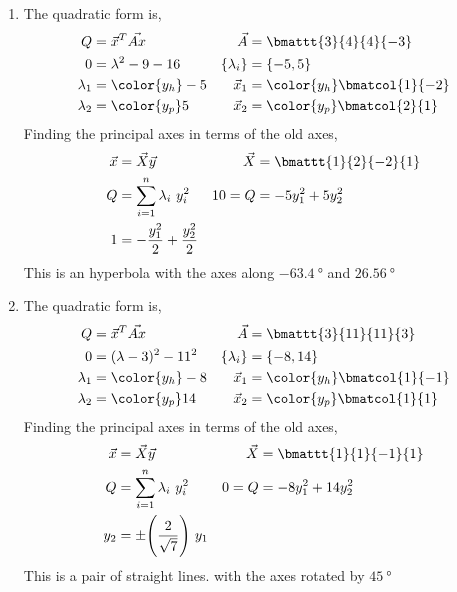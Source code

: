 \begin{enumerate}
    \item The quadratic form is,
          \begin{align}
              Q             & = \vec{x}^T \vec{Ax}          &
              \vec{A}       & = \bmattt{3}{4}{4}{-3}          \\
              0             & = \lambda^2 - 9 - 16          &
              \{\lambda_i\} & = \{-5, 5\}                     \\
              \lambda_1     & = \color{y_h} -5              &
              \vec{x}_1     & = \color{y_h} \bmatcol{1}{-2}   \\
              \lambda_2     & = \color{y_p} 5               &
              \vec{x}_2     & = \color{y_p} \bmatcol{2}{1}
          \end{align}
          Finding the principal axes in terms of the old axes,
          \begin{align}
              \vec{x} & = \vec{X}\vec{y}                     &
              \vec{X} & = \bmattt{1}{2}{-2}{1}                 \\
              Q       & = \sum_{i=1}^{n}\lambda_i\ y_i^2     &
              10 = Q  & = -5y_1^2 + 5y_2^2                     \\
              1       & = -\frac{y_1^2}{2} + \frac{y_2^2}{2}
          \end{align}
          This is an hyperbola with the axes along $ \SI{-63.4}{\degree} $ and
          $ \SI{26.56}{\degree} $

    \item The quadratic form is,
          \begin{align}
              Q             & = \vec{x}^T \vec{Ax}          &
              \vec{A}       & = \bmattt{3}{11}{11}{3}         \\
              0             & = (\lambda - 3)^2 - 11^2      &
              \{\lambda_i\} & = \{-8, 14\}                    \\
              \lambda_1     & = \color{y_h} -8              &
              \vec{x}_1     & = \color{y_h} \bmatcol{1}{-1}   \\
              \lambda_2     & = \color{y_p} 14              &
              \vec{x}_2     & = \color{y_p} \bmatcol{1}{1}
          \end{align}
          Finding the principal axes in terms of the old axes,
          \begin{align}
              \vec{x} & = \vec{X}\vec{y}                          &
              \vec{X} & = \bmattt{1}{1}{-1}{1}                      \\
              Q       & = \sum_{i=1}^{n}\lambda_i\ y_i^2          &
              0 = Q   & = -8y_1^2 + 14y_2^2                         \\
              y_2     & = \pm \Bigg(\frac{2}{\sqrt{7}}\Bigg)\ y_1
          \end{align}
          This is a pair of straight lines. with the axes rotated by $ \SI{45}{\degree} $


\end{enumerate}
